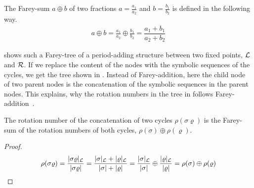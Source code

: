 \begin{definition}
	The Farey-sum $a \oplus b$ of two fractions $a = \frac{a_1}{a_2}$ and $b = \frac{b_1}{b_2}$ is defined in the following way.
	\begin{align}
		a \oplus b = \frac{a_1}{a_2} \oplus \frac{b_1}{b_2} = \dfrac{a_1 + b_1}{a_2 + b_2}
	\end{align}
\end{definition}

 shows such a Farey-tree of a period-adding structure between two fixed points, $\mathcal{L}$ and $\mathcal{R}$.
If we replace the content of the nodes with the symbolic sequences of the cycles, we get the tree shown in .
Instead of Farey-addition, here the child node of two parent nodes is the concatenation of the symbolic sequences in the parent nodes.
This explains, why the rotation numbers in the tree in  follows Farey-addition~\cite{granados14adding}.

\begin{theorem}
	The rotation number of the concatenation of two cycles $\rho(\sigma\varrho)$ is the Farey-sum of the rotation numbers of both cycles, $\rho(\sigma) \oplus \rho(\varrho)$.
\end{theorem}

\begin{proof}
	\begin{align*}
		\rho(\sigma\varrho)
		= \dfrac{|\sigma\varrho|_{\mathcal{L}}}{|\sigma\varrho|}
		= \dfrac{|\sigma|_{\mathcal{L}} + |\varrho|_{\mathcal{L}}}{|\sigma| + |\varrho|}
		= \dfrac{|\sigma|_{\mathcal{L}}}{|\sigma|} \oplus \dfrac{|\varrho|_{\mathcal{L}}}{|\varrho|}
		= \rho(\sigma) \oplus \rho(\varrho)
	\end{align*}
\end{proof}

